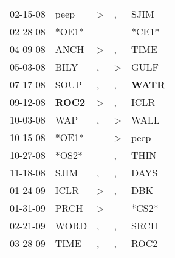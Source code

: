 \begin{supertabular}{p{0.07\textwidth}p{0.06\textwidth}p{0.02\textwidth}p{0.02\textwidth}p{0.06\textwidth}}
          02-15-08\textsuperscript{} &           peep\textsuperscript{} &     \textgreater &                , &           SJIM\textsuperscript{} \\
          02-28-08\textsuperscript{} &                            *OE1* &                  &                  &                            *CE1* \\
          04-09-08\textsuperscript{} &           ANCH\textsuperscript{} &     \textgreater &                , &           TIME\textsuperscript{} \\
          05-03-08\textsuperscript{} &           BILY\textsuperscript{} &                , &     \textgreater &           GULF\textsuperscript{} \\
          07-17-08\textsuperscript{} &           SOUP\textsuperscript{} &                , &                , &  \textbf{WATR\textsuperscript{}} \\
          09-12-08\textsuperscript{} &  \textbf{ROC2\textsuperscript{}} &     \textgreater &                , &           ICLR\textsuperscript{} \\
          10-03-08\textsuperscript{} &            WAP\textsuperscript{} &                , &     \textgreater &           WALL\textsuperscript{} \\
          10-15-08\textsuperscript{} &                            *OE1* &                  &     \textgreater &           peep\textsuperscript{} \\
          10-27-08\textsuperscript{} &                            *OS2* &                  &                , &           THIN\textsuperscript{} \\
          11-18-08\textsuperscript{} &           SJIM\textsuperscript{} &                , &                , &           DAYS\textsuperscript{} \\
          01-24-09\textsuperscript{} &           ICLR\textsuperscript{} &     \textgreater &                , &            DBK\textsuperscript{} \\
          01-31-09\textsuperscript{} &           PRCH\textsuperscript{} &     \textgreater &                  &                            *CS2* \\
          02-21-09\textsuperscript{} &           WORD\textsuperscript{} &                , &                , &           SRCH\textsuperscript{} \\
          03-28-09\textsuperscript{} &           TIME\textsuperscript{} &                , &                , &           ROC2\textsuperscript{} \\

\end{supertabular}
